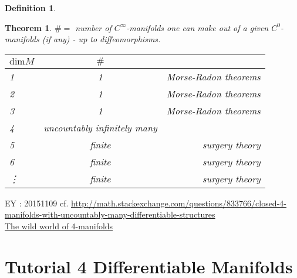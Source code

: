 \documentclass[10pt, twoside]{amsart}
\newtheorem{theorem}{Theorem}
\newtheorem{definition}{Definition}
\begin{document}
\begin{multicols*}{2}
\begin{definition}


\end{definition}

\begin{theorem}
  $\# = $ number of $C^{\infty}$-manifolds one can make out of a given $C^0$-manifolds (if any) - up to diffeomorphisms.  

\begin{tabular}{l | c r }
  $\text{dim}M$ &  $\#$ &  \\
  \hline
  1  & 1  & Morse-Radon theorems \\
 2  & 1  & Morse-Radon theorems \\
 3 & 1  & Morse-Radon theorems \\
4 & uncountably infinitely many & \\
5 &   finite  & surgery theory \\
6 &  finite & surgery theory \\
\vdots & finite & surgery theory
\end{tabular}

\end{theorem}

EY : 20151109 cf. \url{http://math.stackexchange.com/questions/833766/closed-4-manifolds-with-uncountably-many-differentiable-structures}  \\
\href{http://www.maths.ed.ac.uk/~aar/papers/scorpan.pdf}{The wild world of 4-manifolds}


\section*{Tutorial 4 Differentiable Manifolds}


\end{multicols*}
\end{document}
